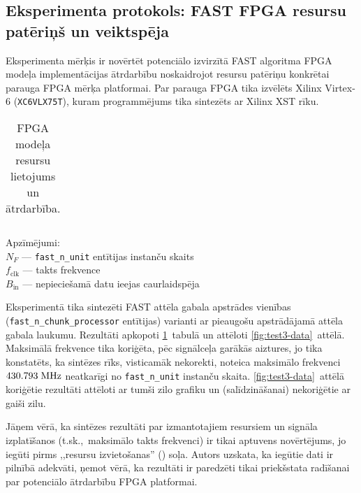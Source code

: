 \subsection{Eksperimenta protokols: FAST FPGA resursu patēriņš un veiktspēja}\label{appx:test3}
\setcounter{table}{0} %
\setcounter{figure}{0} %
Eksperimenta mērķis ir novērtēt potenciālo izvirzītā FAST algoritma FPGA modeļa
implementācijas ātrdarbību noskaidrojot resursu patēriņu 
konkrētai parauga FPGA mērķa platformai.
Par parauga FPGA tika izvēlēts Xilinx Virtex-6 (\texttt{XC6VLX75T}), %
kuram programmējums tika sintezēts ar Xilinx XST rīku.

\begin{table}[hb]\footnotesize
	\centering
	\caption{FPGA modeļa resursu lietojums un ātrdarbība.}
	\label{tbl:test3-data}
	\vspace{4pt}
	\begin{tabular}{*{7}{c}}
		\toprule
		
		\bottomrule
	\end{tabular}
	\begin{minipage}{0.5\linewidth}
		\noindent Apzīmējumi:\\
		$N_F$ --- \texttt{fast\_n\_unit} entītijas instanču skaits\\
		$f_\text{clk}$ --- takts frekvence\\
		$B_\text{in}$ --- nepieciešamā datu ieejas caurlaidspēja
	\end{minipage}
\end{table}

Eksperimentā tika sintezēti FAST attēla gabala apstrādes vienības
(\texttt{fast\_n\_chunk\_processor} entītijas) varianti ar pieaugošu
apstrādājamā attēla gabala laukumu. Rezultāti apkopoti
\ref{tbl:test3-data}~tabulā un attēloti \ref{fig:test3-data}~attēlā.
Maksimālā frekvence tika koriģēta, pēc
signālceļa garākās aiztures, jo tika konstatēts, ka sintēzes rīks,
visticamāk nekorekti, noteica maksimālo frekvenci $430.793\;\mathrm{MHz}$
neatkarīgi no \texttt{fast\_n\_unit} instanču skaita.
\ref{fig:test3-data}~attēlā koriģētie rezultāti attēloti ar tumši zilo
grafiku un (salīdzināšanai) nekoriģētie ar gaiši zilu.

Jāņem vērā, ka sintēzes rezultāti par izmantotajiem resursiem un signāla izplatīšanos
(t.sk.,~maksimālo takts frekvenci) ir tikai aptuvens novērtējums, jo iegūti
pirms ,,resursu izvietošanas'' () soļa.
Autors uzskata, ka iegūtie dati ir pilnībā adekvāti,
ņemot vērā, ka rezultāti ir paredzēti tikai priekšstata radīšanai par
potenciālo ātrdarbību FPGA platformai.

